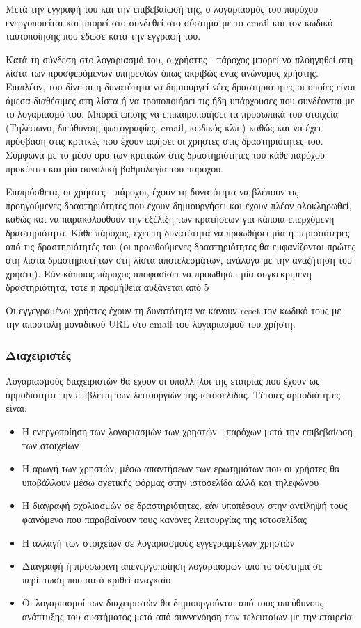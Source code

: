 \documentclass[letterpaper,6pt]{article}
\begin{document}
Μετά την εγγραφή του και την επιβεβαίωσή της, ο λογαριασμός του παρόχου ενεργοποιείται και μπορεί στο συνδεθεί στο σύστημα με το email και τον κωδικό ταυτοποίησης που έδωσε κατά την εγγραφή του.

Κατά τη σύνδεση στο λογαριασμό του, ο χρήστης - πάροχος μπορεί να πλοηγηθεί στη λίστα των προσφερόμενων υπηρεσιών όπως ακριβώς ένας ανώνυμος χρήστης. Επιπλέον, του δίνεται η δυνατότητα να δημιουργεί νέες δραστηριότητες οι οποίες είναι άμεσα διαθέσιμες στη λίστα ή να τροποποιήσει τις ήδη υπάρχουσες που συνδέονται με το λογαριασμό του. Μπορεί επίσης να επικαιροποιήσει τα προσωπικά του στοιχεία (Τηλέφωνο, διεύθυνση, φωτογραφίες, email, κωδικός κλπ.)  καθώς και να έχει πρόσβαση στις κριτικές που έχουν αφήσει οι χρήστες στις δραστηριότητες του. Σύμφωνα με το μέσο όρο των κριτικών στις δραστηριότητες του κάθε παρόχου προκύπτει και μία συνολική βαθμολογία του παρόχου.

Επιπρόσθετα, οι χρήστες - πάροχοι, έχουν τη δυνατότητα να βλέπουν τις προηγούμενες δραστηριότητες που έχουν δημιουργήσει και έχουν πλέον ολοκληρωθεί, καθώς και να παρακολουθούν την εξέλιξη των κρατήσεων για κάποια επερχόμενη δραστηριότητα.
Κάθε πάροχος, έχει τη δυνατότητα να προωθήσει μία ή περισσότερες από τις δραστηριότητές του (οι προωθούμενες δραστηριότητες θα εμφανίζονται πρώτες στη λίστα δραστηριοτήτων στη λίστα αποτελεσμάτων, ανάλογα με την αναζήτηση του χρήστη). Εάν κάποιος πάροχος αποφασίσει να προωθήσει μία συγκεκριμένη δραστηριότητα, τότε η προμήθεια αυξάνεται από 5%
			
Οι εγγεγραμένοι χρήστες έχουν τη δυνατότητα να κάνουν reset τον κωδικό τους με την αποστολή μοναδικού URL στο email του λογαριασμού του χρήστη.

\subsubsection{Διαχειριστές}
Λογαριασμούς διαχειριστών θα έχουν οι υπάλληλοι της εταιρίας που έχουν ως αρμοδιότητα την επίβλεψη των λειτουργιών της ιστοσελίδας. Τέτοιες αρμοδιότητες είναι:
\begin{itemize}
  \item Η ενεργοποίηση των λογαριασμών των χρηστών - παρόχων μετά την επιβεβαίωση των στοιχείων
  \item Η αρωγή των χρηστών, μέσω απαντήσεων των ερωτημάτων που οι χρήστες θα υποβάλλουν μέσω σχετικής φόρμας στην ιστοσελίδα αλλά και τηλεφώνου
  \item Η διαγραφή σχολιασμών σε δραστηριότητες, εάν υποπέσουν στην αντίληψή τους φαινόμενα που παραβαίνουν τους κανόνες λειτουργίας της ιστοσελίδας
  \item Η αλλαγή των στοιχείων σε λογαριασμούς εγγεγραμμένων χρηστών
  \item Διαγραφή ή προσωρινή απενεργοποίηση λογαριασμών από το σύστημα σε περίπτωση που αυτό κριθεί αναγκαίο
  \item Οι λογαριασμοί των διαχειριστών θα δημιουργούνται από τους υπεύθυνους ανάπτυξης του συστήματος μετά από συννενόηση των τελευταίων με την εταιρεία
\end{itemize}
\end{document}
